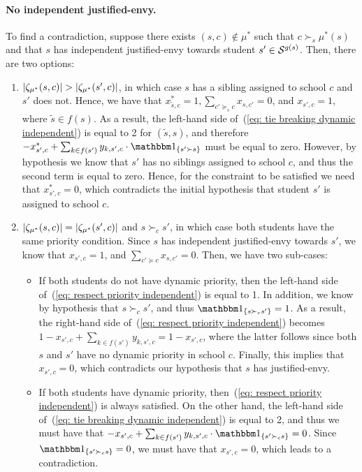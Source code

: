                 \paragraph{No independent justified-envy.} To find a contradiction, suppose there exists \((s,c) \notin \mu^*\) such that \(c \succ_s \mu^*(s)\) and that \(s\) has independent justified-envy towards student \(s' \in \mathcal{S}^{g(s)}\). Then, there are two options:
                \begin{enumerate}
                  \item \(\left|\zeta_{\mu^*} (s,c)\right| > \left|\zeta_{\mu^*} (s',c)\right|\), in which case \(s\) has a sibling assigned to school \(c\) and \(s'\) does not. Hence, we have that \(x^*_{\tilde{s},c} = 1, \sum_{c'\succeq_s c} x_{s,c'} = 0\), and \(x_{s',c} = 1\), where \(\tilde{s} \in f(s)\). As a result, the left-hand side of~(\ref{eq: tie breaking dynamic independent}) is equal to 2 for \((\tilde{s}, s)\), and therefore \(-x^*_{s',c} + \sum_{k\in f(s')} y_{k,s',c}\cdot \ind{s' \succ s}\) must be equal to zero.
                  However, by hypothesis we know that \(s'\) has no siblings assigned to school \(c\), and thus the second term is equal to zero. Hence, for the constraint to be satisfied we need that \(x^*_{s',c} = 0\), which contradicts the initial hypothesis that student \(s'\) is assigned to school \(c\).
                  \item \(\left|\zeta_{\mu^*} (s,c)\right| = \left|\zeta_{\mu^*} (s',c)\right|\) and \(s\succ_c s'\), in which case both students have the same priority condition.
                  Since \(s\) has independent justified-envy towards \(s'\), we know that \(x_{s',c} = 1\), and \(\sum_{c'\succeq c} x_{s,c'} = 0\). Then, we have two sub-cases:
                  \begin{itemize}
                    \item If both students do not have dynamic priority, then the left-hand side of~(\ref{eq: respect priority independent}) is equal to 1. In addition, we know by hypothesis that \(s \succ_c s'\), and thus \(\ind{s\succ_c s'} = 1\). As a result, the right-hand side of~(\ref{eq: respect priority independent}) becomes \(1 - x_{s',c}
                    + \sum_{k\in f(s')} y_{k, s',c} = 1 - x_{s',c}\), where the latter follows since both \(s\) and \(s'\) have no dynamic priority in school \(c\). Finally, this implies that \(x_{s',c} = 0\), which contradicts our hypothesis that \(s\) has justified-envy.
                    \item If both students have dynamic priority, then~(\ref{eq: respect priority independent}) is always satisfied. On the other hand, the left-hand side of~(\ref{eq: tie breaking dynamic independent}) is equal to 2, and thus we must have that \(-x_{s',c}+ \sum_{k\in f(s')} y_{k, s',c}\cdot \ind{s' \succ_c s} = 0\).
                    Since \(\ind{s' \succ_c s} = 0\), we must have that \(x_{s',c} = 0\), which leads to a contradiction.
                  \end{itemize}
                \end{enumerate}
